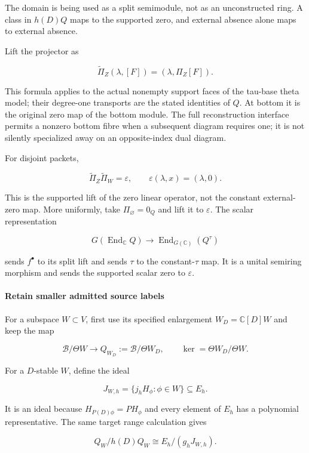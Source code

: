 The domain is being used as a split semimodule, not as an unconstructed ring. A class in \(h(D)Q\)
maps to the supported zero, and external absence alone maps to external absence.

Lift the projector as

\[\widetilde\Pi_Z(\lambda,[F])=(\lambda,\Pi_Z[F]).\]

This formula applies to the actual nonempty support faces of the tau-base theta model; their
degree-one transports are the stated identities of \(Q\). At bottom it is the original zero map of
the bottom module. The full reconstruction interface permits a nonzero bottom fibre when a
subsequent diagram requires one; it is not silently specialized away on an opposite-index dual
diagram.

For disjoint packets,

\[\boxed{\widetilde\Pi_Z\widetilde\Pi_W=\varepsilon,
\qquad\varepsilon(\lambda,x)=(\lambda,0).}\]

This is the supported lift of the zero linear operator, not the constant external-zero map. More
uniformly, take \(\Pi_\varnothing=0_Q\) and lift it to \(\varepsilon\). The scalar representation

\[G(\operatorname{End}_{\mathbb C}Q)\longrightarrow
\operatorname{End}_{G(\mathbb C)}(Q^\tau)\]

sends \(f^\bullet\) to its split lift and sends \(\tau\) to the constant-\(\tau\) map. It is a
unital semiring morphism and sends the supported scalar zero to \(\varepsilon\).

\paragraph{Retain smaller admitted source labels}\label{pr_8:retain-smaller-admitted-source-labels}

For a subspace \(W\subset V\), first use its specified enlargement \(W_D=\mathbb C[D]W\) and keep
the map

\[\mathscr B/\Theta W\longrightarrow Q_{W_D}:=\mathscr B/\Theta W_D,
\qquad\ker=\Theta W_D/\Theta W.\]

For a \(D\)-stable \(W\), define the ideal

\[J_{W,h}=\{j_hH_\phi:\phi\in W\}\subseteq E_h.\]

It is an ideal because \(H_{P(D)\phi}=P H_\phi\) and every element of \(E_h\) has a polynomial
representative. The same target range calculation gives

\[\boxed{Q_W/h(D)Q_W\cong E_h/(g_hJ_{W,h}).}\]

